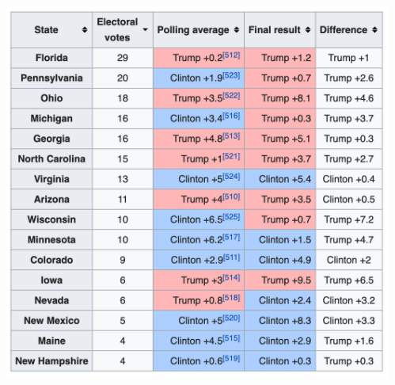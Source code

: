 \documentclass[aspectratio=169]{beamer}
\theoremstyle{principle}
\begin{document}
\begin{frame}
\begin{columns}
\begin{column}{0.5\textwidth}
\end{column}
\begin{column}{0.5\textwidth}
\begin{center}
\includegraphics[scale=0.35]{polling_2016.png}
\end{center}
\end{column}
\end{columns}

\end{frame}
\end{document}
